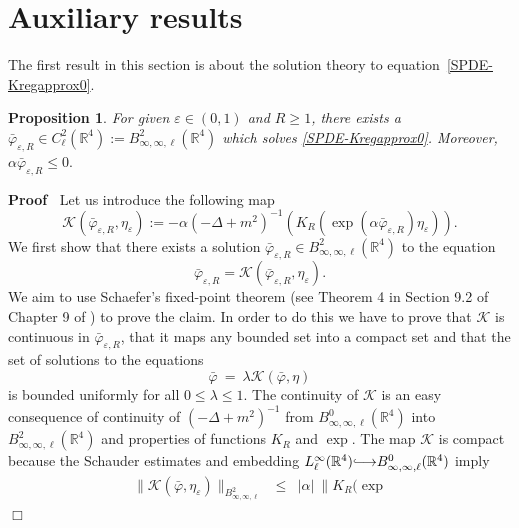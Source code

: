 \documentclass{article}
\newcommand{\assign}{:=}
\newcommand{\longhookrightarrow}{{\lhook\joinrel\relbar\joinrel\rightarrow}}
\newenvironment{proof}{\noindent\textbf{Proof\ }}{\hspace*{\fill}$\Box$\medskip}
\newtheorem{proposition}{Proposition}
{\theorembodyfont{\rmfamily}\newtheorem{remark}{Remark}}
\begin{document}
\appendix\section{Auxiliary results}\label{sec-appendix}
The first result in this section is about the solution theory to
equation~\eqref{SPDE-Kregapprox0}.
%
\begin{proposition}
  \label{prop-reg soln of varphi-bar}For given $\varepsilon \in (0, 1)$ and $R
  \geqslant 1$, there exists a $\bar{\varphi}_{\varepsilon, R} \in
  C_{\ell}^2 (\mathbb{R}^4) \assign B^2_{\infty, \infty, \ell}
  (\mathbb{R}^4)$ which solves \eqref{SPDE-Kregapprox0}. Moreover, $\alpha
  \bar{\varphi}_{\varepsilon, R} \leqslant 0.$
\end{proposition}
%
\begin{proof}
  Let us introduce the following map
  \begin{equation}
      \mathcal{K} (\bar{\varphi}_{\varepsilon, R}, \eta_{\varepsilon}) \assign
      - \alpha (- \Delta + m^2)^{- 1} (K_R (\exp (\alpha
      \bar{\varphi}_{\varepsilon, R}) \eta_{\varepsilon})) .
    \label{defn-K}
  \end{equation}
  We first show that there exists a solution $\bar{\varphi}_{\varepsilon, R}
  \in B^2_{\infty, \infty, \ell} (\mathbb{R}^4)$ to the equation
  \[ 
       \bar{\varphi}_{\varepsilon, R} =\mathcal{K}
       (\bar{\varphi}_{\varepsilon, R}, \eta_{\varepsilon}) .
      \]
  We aim to use Schaefer's fixed-point theorem (see Theorem 4 in Section 9.2
  of Chapter 9 of {\cite{Evans98}}) to prove the claim. In order to do this we
  have to prove that $\mathcal{K}$ is continuous in
  $\bar{\varphi}_{\varepsilon, R}$, that it maps any bounded set into a
  compact set and that the set of solutions to the equations
  \[ 
       \bar{\varphi} ~=~ \lambda \mathcal{K} (\bar{\varphi}, \eta)
      \]
  is bounded uniformly for all $0 \leqslant \lambda \leqslant 1$. The
  continuity of $\mathcal{K}$ is an easy consequence of continuity of $(-
  \Delta + m^2)^{- 1}$ from $B^0_{\infty, \infty, \ell} (\mathbb{R}^4)$ into
  $B^2_{\infty, \infty, \ell} (\mathbb{R}^4)$ and properties of functions $K_R$ and  $\exp$. The map $\mathcal{K}$ is compact because the Schauder
  estimates and embedding $L^{\infty}_{\ell} (\mathbb{R}^4)
  \longhookrightarrow B^0_{\infty, \infty, \ell} (\mathbb{R}^4)$ imply
  \begin{equation}
    \begin{array}{lllll}
      \| \mathcal{K} (\bar{\varphi}, \eta_{\varepsilon}) \|_{B^2_{\infty,
      \infty, \ell}} & \leqslant & | \alpha |~ \| K_R (\exp

\end{array}
\end{equation}
\end{proof}
\end{document}
